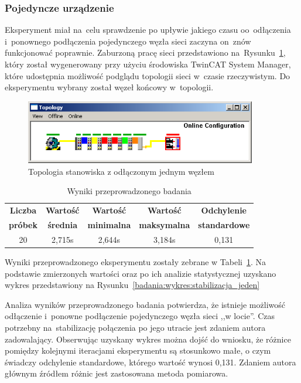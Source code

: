 \subsubsection{Pojedyncze urządzenie}
Eksperyment miał na~celu sprawdzenie po upływie jakiego czasu oo~odłączenia i~ponownego podłączenia pojedynczego węzła sieci zaczyna on~znów funkcjonować poprawnie. Zaburzoną pracę sieci przedstawiono na~Rysunku~\ref{one_slave}, który został wygenerowany przy użyciu środowiska TwinCAT System Manager, które udostępnia możliwość podglądu topologii sieci w~czasie rzeczywistym. Do eksperymentu wybrany został węzeł końcowy w~topologii.
\begin{figure}[!htb] 	\centering 	\includegraphics[width=0.9\textwidth]{images/topologyCXerror} \caption{Topologia stanowiska z odłączonym jednym węzłem} \label{one_slave} \end{figure}

\begin{table}[!htb]
\begin{center}
\begin{tabular}{| c | c | c | c | c |}\hline
\textbf{Liczba} & \textbf{Wartość} & \textbf{Wartość} & \textbf{Wartość} & \textbf{Odchylenie} \\
\textbf{próbek} & \textbf{średnia} & \textbf{minimalna} & \textbf{maksymalna} & \textbf{standardowe} \\\hline\hline
20 & 2,715s & 2,644s & 3,184s & 0,131\\\hline
\end{tabular}
\end{center}
\vspace*{-6mm}
  \caption{Wyniki przeprowadzonego badania}
	\label{badania:wyniki:stabilizacja_jeden}
\end{table}

\noindent Wyniki przeprowadzonego eksperymentu zostały zebrane w Tabeli~\ref{badania:wyniki:stabilizacja_jeden}. Na podstawie zmierzonych wartości oraz po ich analizie statystycznej uzyskano wykres przedstawiony na Rysunku~\ref{badania:wykres:stabilizacja_jeden}


Analiza wyników przeprowadzonego badania potwierdza, że istnieje możliwość odłączenie i~ponowne podłączenie pojedynczego węzła sieci ,,w locie''. Czas potrzebny na~stabilizację połączenia po jego utracie jest zdaniem autora zadowalający. Obserwując uzyskany wykres można dojść do wniosku, że różnice pomiędzy kolejnymi iteracjami eksperymentu są stosunkowo małe, o czym świadczy odchylenie standardowe, którego wartość wynosi 0,131. Zdaniem autora głównym źródłem różnic jest zastosowana metoda pomiarowa.

